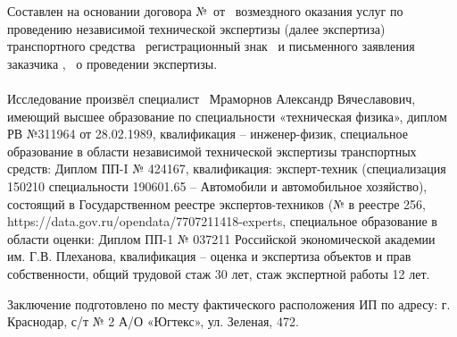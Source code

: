 \vspace{2mm}
\noindent %
Составлен на основании	договора № \NomerDoc\,от \, возмездного оказания услуг   по проведению независимой технической экспертизы (далее экспертиза)  транспортного средства \, регистрационный знак \, и письменного заявления заказчика , \,  о проведении экспертизы.

\paragraph*{}
Исследование произвёл  специалист
\,  Мраморнов Александр Вячеславович, имеющий высшее  образование по специальности «техническая физика», диплом РВ №311964 от 28.02.1989, квалификация -- инженер-физик, специальное образование в области независимой технической экспертизы транспортных средств: Диплом ПП-I № 424167, квалификация: эксперт-техник (специализация 150210 специальности 190601.65 – Автомобили и автомобильное хозяйство), состоящий в Государственном реестре экспертов-техников (№ в реестре 256, https://data.gov.ru/opendata/7707211418-experts, специальное образование в области оценки: Диплом ПП-1 № 037211 Российской экономической академии им. Г.В. Плеханова, квалификация -- оценка и экспертиза объектов и прав собственности,   общий трудовой  стаж 30 лет, стаж  экспертной работы  12 лет. 


\par Заключение подготовлено по месту фактического расположения ИП по адресу: г. Краснодар, с/т № 2 А/О «Югтекс», ул. Зеленая, 472.
\vspace{4mm}
